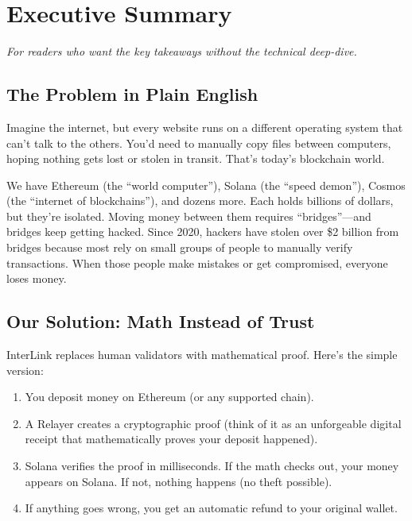 \documentclass[11pt,a4paper]{article}
\begin{document}
\newpage

\section*{Executive Summary}

\textit{For readers who want the key takeaways without the technical deep-dive.}

\subsection*{The Problem in Plain English}

Imagine the internet, but every website runs on a different operating system that can't talk to the others. You'd need to manually copy files between computers, hoping nothing gets lost or stolen in transit. That's today's blockchain world.

We have Ethereum (the ``world computer''), Solana (the ``speed demon''), Cosmos (the ``internet of blockchains''), and dozens more. Each holds billions of dollars, but they're isolated. Moving money between them requires ``bridges''---and bridges keep getting hacked. Since 2020, hackers have stolen over \$2 billion from bridges because most rely on small groups of people to manually verify transactions. When those people make mistakes or get compromised, everyone loses money.

\subsection*{Our Solution: Math Instead of Trust}

InterLink replaces human validators with mathematical proof. Here's the simple version:

\begin{enumerate}
    \item You deposit money on Ethereum (or any supported chain).
    \item A Relayer creates a cryptographic proof (think of it as an unforgeable digital receipt that mathematically proves your deposit happened).
    \item Solana verifies the proof in milliseconds. If the math checks out, your money appears on Solana. If not, nothing happens (no theft possible).
    \item If anything goes wrong, you get an automatic refund to your original wallet.
\end{enumerate}
\end{document}

